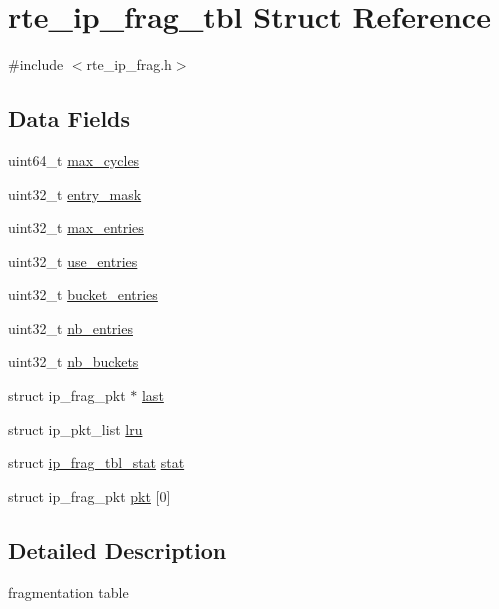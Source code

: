 \hypertarget{structrte__ip__frag__tbl}{}\section{rte\+\_\+ip\+\_\+frag\+\_\+tbl Struct Reference}
\label{structrte__ip__frag__tbl}


{\ttfamily \#include $<$rte\+\_\+ip\+\_\+frag.\+h$>$}

\subsection*{Data Fields}
\begin{DoxyCompactItemize}
\item 
uint64\+\_\+t \hyperlink{structrte__ip__frag__tbl_ac2135a7a3ddad5d48d84af46c455ad1d}{max\+\_\+cycles}
\item 
uint32\+\_\+t \hyperlink{structrte__ip__frag__tbl_ad93ad237346ba2b07f814ee5616f80e3}{entry\+\_\+mask}
\item 
uint32\+\_\+t \hyperlink{structrte__ip__frag__tbl_a9c1c1d6f14dcb125c541f9a3db991f6c}{max\+\_\+entries}
\item 
uint32\+\_\+t \hyperlink{structrte__ip__frag__tbl_a4df078fc42bb1b234bd10b40546071ed}{use\+\_\+entries}
\item 
uint32\+\_\+t \hyperlink{structrte__ip__frag__tbl_ad1c0b79e09e6b654bc7c268a9ec0084f}{bucket\+\_\+entries}
\item 
uint32\+\_\+t \hyperlink{structrte__ip__frag__tbl_a1004e9477898d1077030789cf8fcefd9}{nb\+\_\+entries}
\item 
uint32\+\_\+t \hyperlink{structrte__ip__frag__tbl_a1d3c086e47ef6c0c0ca7542843a49c43}{nb\+\_\+buckets}
\item 
struct ip\+\_\+frag\+\_\+pkt $\ast$ \hyperlink{structrte__ip__frag__tbl_a77c4edf93b96c214ad2b1e3f2ffa0489}{last}
\item 
struct ip\+\_\+pkt\+\_\+list \hyperlink{structrte__ip__frag__tbl_a851486c7f4964bdb209fba9a9c118332}{lru}
\item 
struct \hyperlink{structip__frag__tbl__stat}{ip\+\_\+frag\+\_\+tbl\+\_\+stat} \hyperlink{structrte__ip__frag__tbl_a92286e54c27d08e716c496680e412cb5}{stat}
\item 
struct ip\+\_\+frag\+\_\+pkt \hyperlink{structrte__ip__frag__tbl_a3336add7f24f2bdac02b837b6e74f468}{pkt} \mbox{[}0\mbox{]}
\end{DoxyCompactItemize}


\subsection{Detailed Description}
fragmentation table 


